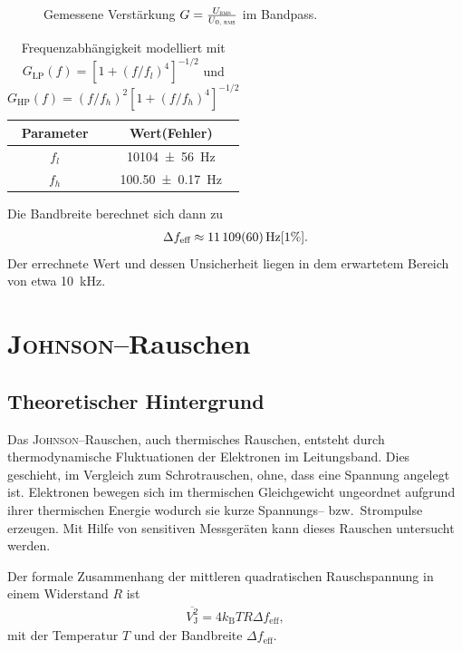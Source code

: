 \documentclass[sn-mathphys-num,iicol]{sn-jnl}
\theoremstyle{thmstyleone}
\theoremstyle{thmstyletwo}
\theoremstyle{thmstylethree}
\begin{document}
\begin{figure}[t]
	\centering
	\resizebox{.5\textwidth}{!}{}
	\caption{Gemessene Verstärkung $G=\frac{U_{\textsc{rms}}}{U_{0\textsc{, rms}}}$ im Bandpass.} \label{fig:bandpass}
\end{figure}
\begin{table}[t]
	\begin{tabular}{cc}
		\toprule
		\textbf{Parameter} & {\textbf{Wert(Fehler)}} \\
		\midrule
		$f_l$              & \SI{10104 \pm 56}{Hz}     \\
		$f_h$              & \SI{100.50 \pm 0.17}{Hz}  \\
		\bottomrule
	\end{tabular}
	\label{tab:bandpass_parameter}
	\caption{Frequenzabhängigkeit modelliert mit $G_\text{LP}(f)=\left[1+(f/f_l)^4\right]^{-1/2}$ und $G_\text{HP}(f)=(f/f_h)^2\left[1+(f/f_h)^4\right]^{-1/2}$}
\end{table}
Die Bandbreite berechnet sich dann zu
\begin{align}
	\Delta f_\text{eff}\approx \SI{11109+-60}{Hz}[1\%]
	.\end{align}
Der errechnete Wert und dessen Unsicherheit liegen in dem erwartetem Bereich von etwa \SI{10}{\kilo Hz}.
\section{\textsc{Johnson}--Rauschen}
\subsection{Theoretischer Hintergrund}
Das \textsc{Johnson}--Rauschen, auch thermisches Rauschen, entsteht durch thermodynamische Fluktuationen der Elektronen im Leitungsband.
Dies geschieht, im Vergleich zum Schrotrauschen, ohne, dass eine Spannung angelegt ist.
Elektronen bewegen sich im thermischen Gleichgewicht ungeordnet aufgrund ihrer thermischen Energie wodurch sie kurze Spannungs-- bzw.\ Strompulse erzeugen.
Mit Hilfe von sensitiven Messgeräten kann dieses Rauschen untersucht werden.

Der formale Zusammenhang der mittleren quadratischen Rauschspannung in einem Widerstand $R$ ist
\begin{align}
	\overline{V^2_\text{J}}=4k_\text{B}TR\Delta f_\text{eff}
	,\end{align}
mit der Temperatur $T$ und der Bandbreite $\Delta f_\text{eff}$.
\end{document}

